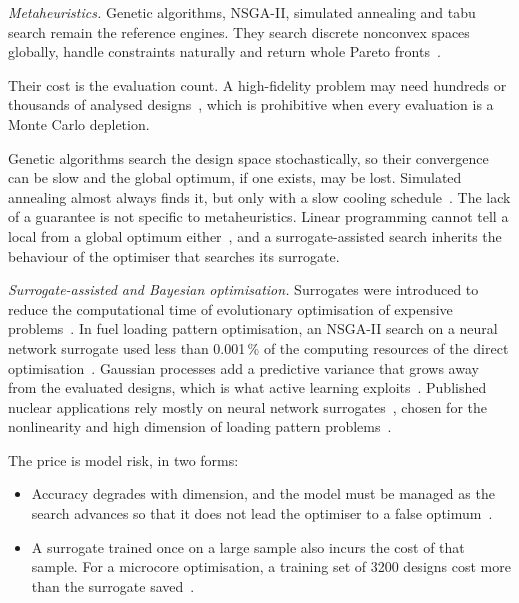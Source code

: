 \emph{Metaheuristics.} Genetic algorithms, NSGA-II, simulated annealing
and tabu search remain the reference engines. They search discrete
nonconvex spaces globally, handle constraints naturally and return whole
Pareto fronts~\cite{deb_nsga2_2002,kropaczek_turinsky_1991}.

Their cost is the evaluation count. A high-fidelity problem may need
hundreds or thousands of analysed designs~\cite{stewart_2021}, which is
prohibitive when every evaluation is a Monte Carlo depletion.

Genetic algorithms search the design space stochastically, so their
convergence can be slow and the global optimum, if one exists, may be
lost. Simulated annealing almost always finds it, but only with a slow
cooling schedule~\cite{stewart_2021}. The lack of a guarantee is not
specific to metaheuristics. Linear programming cannot tell a local from a
global optimum either~\cite{downar_1988}, and a surrogate-assisted search
inherits the behaviour of the optimiser that searches its surrogate.

\emph{Surrogate-assisted and Bayesian optimisation.} Surrogates were
introduced to reduce the computational time of evolutionary optimisation
of expensive problems~\cite{jin_2011}. In fuel loading pattern
optimisation, an NSGA-II search on a neural network surrogate used less
than 0.001\,\% of the computing resources of the direct optimisation~\cite{whyte_2020}. Gaussian processes add a predictive
variance that grows away from the evaluated designs, which is what
active learning exploits~\cite{rasmussen_gp_2006}. Published nuclear
applications rely mostly on neural network
surrogates~\cite{whyte_2020,wan_2022}, chosen for the nonlinearity and
high dimension of loading pattern problems~\cite{whyte_2020}.

The price is model risk, in two forms:

\begin{itemize}
  \item Accuracy degrades with dimension, and the model must be managed
        as the search advances so that it does not lead the optimiser to
        a false optimum~\cite{jin_2011}.

  \item A surrogate trained once on a large sample also incurs the cost
        of that sample. For a microcore optimisation, a training set of
        3200 designs cost more than the surrogate saved~\cite{whyte_2020}.
\end{itemize}

